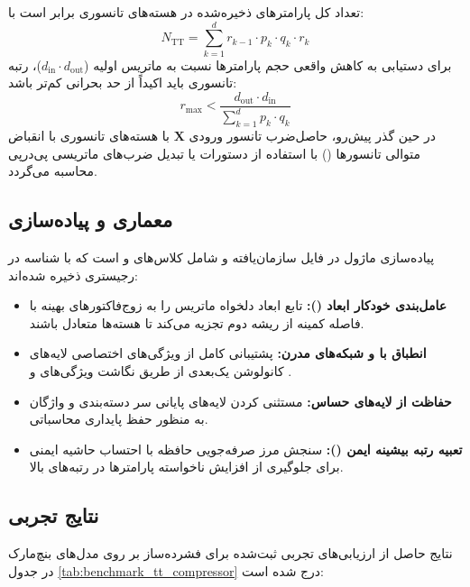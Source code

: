 تعداد کل پارامترهای ذخیره‌شده در هسته‌های تانسوری برابر است با:
\begin{equation}
N_{\text{TT}} = \sum_{k=1}^d r_{k-1} \cdot p_k \cdot q_k \cdot r_k
\end{equation}
برای دستیابی به کاهش واقعی حجم پارامترها نسبت به ماتریس اولیه ($d_{\text{in}} \cdot d_{\text{out}}$)، رتبه تانسوری باید اکیداً از حد بحرانی کم‌تر باشد:
\begin{equation}
r_{\text{max}} < \frac{d_{\text{out}} \cdot d_{\text{in}}}{\sum_{k=1}^d p_k \cdot q_k}
\end{equation}
در حین گذر پیش‌رو، حاصل‌ضرب تانسور ورودی $\mathbf{X}$ با هسته‌های تانسوری با انقباض متوالی تانسورها () با استفاده از دستورات  یا تبدیل ضرب‌های ماتریسی پی‌درپی محاسبه می‌گردد.

\subsection{معماری و پیاده‌سازی}
پیاده‌سازی ماژول در فایل  سازمان‌یافته و شامل کلاس‌های  و  است که با شناسه  در رجیستری ذخیره شده‌اند:
\begin{itemize}
    \item \textbf{عامل‌بندی خودکار ابعاد ():} تابع  ابعاد دلخواه ماتریس را به زوج‌فاکتورهای بهینه با فاصله کمینه از ریشه دوم تجزیه می‌کند تا هسته‌ها متعادل باشند.
    \item \textbf{انطباق با  و شبکه‌های مدرن:} پشتیبانی کامل از ویژگی‌های اختصاصی لایه‌های کانولوشن یک‌بعدی  از طریق نگاشت ویژگی‌های  و .
    \item \textbf{حفاظت از لایه‌های حساس:} مستثنی کردن لایه‌های پایانی سر دسته‌بندی و واژگان به منظور حفظ پایداری محاسباتی.
    \item \textbf{تعبیه رتبه بیشینه ایمن ():} سنجش مرز صرفه‌جویی حافظه با احتساب حاشیه ایمنی  برای جلوگیری از افزایش ناخواسته پارامترها در رتبه‌های بالا.
\end{itemize}

\subsection{نتایج تجربی}
نتایج حاصل از ارزیابی‌های تجربی ثبت‌شده برای فشرده‌ساز  بر روی مدل‌های بنچ‌مارک در جدول \ref{tab:benchmark_tt_compressor} درج شده است:

